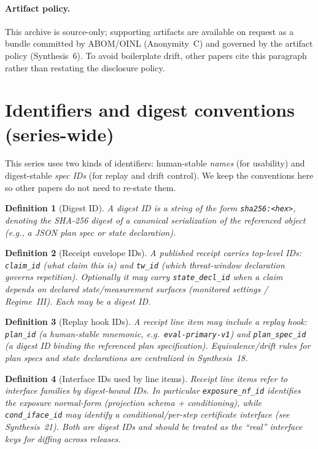 \documentclass[11pt]{article}
\newtheorem{definition}{Definition}
\begin{document}
\paragraph{Artifact policy.}
This archive is source-only; supporting artifacts are available on request as a bundle committed by ABOM/OINL (Anonymity~C) and governed by the artifact policy (Synthesis~6).\cite{series:abomoinl,series:artifactpolicy}
To avoid boilerplate drift, other papers cite this paragraph rather than restating the disclosure policy.

\section{Identifiers and digest conventions (series-wide)}
This series uses two kinds of identifiers: human-stable \emph{names} (for usability) and digest-stable \emph{spec IDs} (for replay and drift control).
We keep the conventions here so other papers do not need to re-state them.

\begin{definition}[Digest ID]
A \emph{digest ID} is a string of the form \texttt{sha256:<hex>}, denoting the SHA-256 digest of a \emph{canonical} serialization of the referenced object (e.g., a JSON plan spec or state declaration).
\end{definition}

\begin{definition}[Receipt envelope IDs]
A published receipt carries top-level IDs:
\texttt{claim\_id} (what claim this is) and \texttt{tw\_id} (which threat-window declaration governs repetition).
Optionally it may carry \texttt{state\_decl\_id} when a claim depends on declared state/measurement surfaces (monitored settings / Regime~III).
Each may be a digest ID.
\end{definition}

\begin{definition}[Replay hook IDs]
A receipt line item may include a replay hook:
\texttt{plan\_id} (a human-stable mnemonic, e.g.\ \texttt{eval-primary-v1}) and \texttt{plan\_spec\_id} (a digest ID binding the referenced plan specification).
Equivalence/drift rules for plan specs and state declarations are centralized in Synthesis~18.
\end{definition}

\begin{definition}[Interface IDs used by line items]
Receipt line items refer to interface families by digest-bound IDs.
In particular \texttt{exposure\_nf\_id} identifies the exposure normal-form (projection schema + conditioning), while \texttt{cond\_iface\_id} may identify a conditional/per-step certificate interface (see Synthesis~21).
Both are digest IDs and should be treated as the ``real'' interface keys for diffing across releases.\cite{series:receiptitems}
\end{definition}
\end{document}

